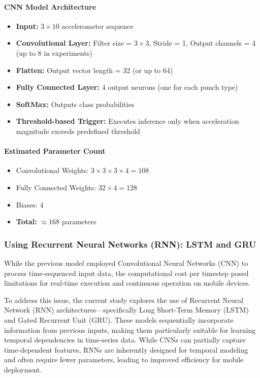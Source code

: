 \documentclass{article}
\begin{document}
\paragraph{CNN Model Architecture}
\begin{itemize}
    \item \textbf{Input:} $3 \times 10$ accelerometer sequence
    \item \textbf{Convolutional Layer:} Filter size = $3 \times 3$, Stride = 1, Output channels = 4 (up to 8 in experiments)
    \item \textbf{Flatten:} Output vector length = 32 (or up to 64)
    \item \textbf{Fully Connected Layer:} 4 output neurons (one for each punch type)
    \item \textbf{SoftMax:} Outputs class probabilities
    \item \textbf{Threshold-based Trigger:} Executes inference only when acceleration magnitude exceeds predefined threshold
\end{itemize}

\paragraph{Estimated Parameter Count}
\begin{itemize}
    \item Convolutional Weights: $3 \times 3 \times 3 \times 4 = 108$
    \item Fully Connected Weights: $32 \times 4 = 128$
    \item Biases: 4
    \item \textbf{Total:} $\approx 168$ parameters
\end{itemize}


\subsubsection{Using Recurrent Neural Networks (RNN): LSTM and GRU}

While the previous model employed Convolutional Neural Networks (CNN) to process time-sequenced input data, the computational cost per timestep posed limitations for real-time execution and continuous operation on mobile devices.

To address this issue, the current study explores the use of Recurrent Neural Network (RNN) architectures—specifically Long Short-Term Memory (LSTM) and Gated Recurrent Unit (GRU). These models sequentially incorporate information from previous inputs, making them particularly suitable for learning temporal dependencies in time-series data. While CNNs can partially capture time-dependent features, RNNs are inherently designed for temporal modeling and often require fewer parameters, leading to improved efficiency for mobile deployment.
\end{document}
